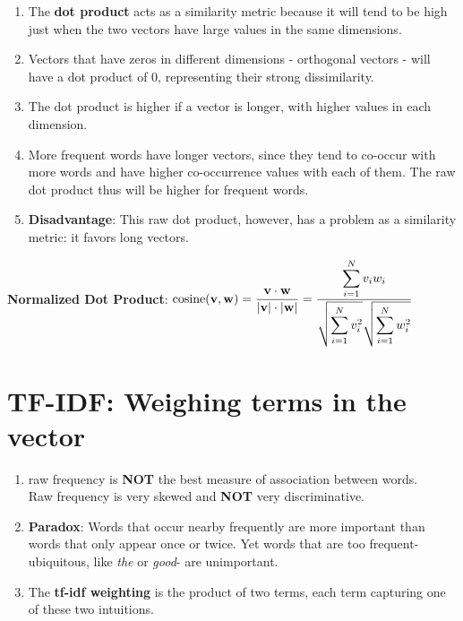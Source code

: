 \begin{enumerate}
    \item The \textbf{dot product} acts as a similarity metric because it will tend to be high just when the two vectors have large values in the same dimensions. 
    
    \item Vectors that have zeros in different dimensions - orthogonal vectors - will have a dot product of 0, representing their strong dissimilarity.

    \item The dot product is higher if a vector is longer, with higher values in each dimension.
    
    \item More frequent words have longer vectors, since they tend to co-occur with more words and have higher co-occurrence values with each of them. The raw dot product thus will be higher for frequent words.

    \item \textbf{Disadvantage}: This raw dot product, however, has a problem as a similarity metric: it favors long vectors.

    
\end{enumerate}


\textbf{Normalized Dot Product}: \( \displaystyle \operatorname{cosine}(\mathbf{v,w}) = \dfrac{\mathbf{v\cdot w}}{|\mathbf{v}|\cdot|\mathbf{w}|} = \dfrac{\displaystyle\sum_{i=1}^{N} v_i w_i}{\displaystyle \sqrt{\sum_{i=1}^{N} v_i^2}\sqrt{\sum_{i=1}^{N} w_i^2}} \)


\section{TF-IDF: Weighing terms in the vector \cite{nlp-1}}\label{TF-IDF: concept}

\begin{enumerate}
    \item raw frequency is \textbf{NOT} the best measure of association between words.\\
    Raw frequency is very skewed and \textbf{NOT} very discriminative.

    \item \textbf{Paradox}: Words that occur nearby frequently are more important than words that only appear once or twice. Yet words that are too frequent-ubiquitous, like \textit{the} or \textit{good}- are unimportant.

    \item The \textbf{tf-idf weighting} is the product of two terms, each term capturing one of these two intuitions.
\end{enumerate}


